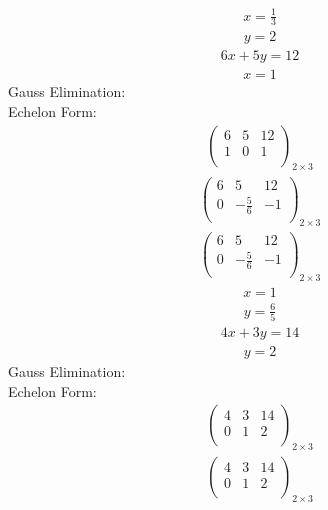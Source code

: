 \documentclass{article}
\begin{document}
\begin{align*}
x=\frac{1}{3}\end{align*}
\begin{align*}
y=2\end{align*}
\begin{align*}
6x + 5y=12\end{align*}
\begin{align*}
x=1\end{align*}
Gauss Elimination:\\
Echelon Form:\\
\begin{align*}
\left(
\begin{array}{cc|c}
6 & 5 & 12\\
1 & 0 & 1\\
\end{array}
\right)_{2\times 3}
\end{align*}
\begin{align*}
\left(
\begin{array}{cc|c}
6 & 5 & 12\\
0 & -\frac{5}{6} & -1\\
\end{array}
\right)_{2\times 3}
\end{align*}
\begin{align*}
\left(
\begin{array}{cc|c}
6 & 5 & 12\\
0 & -\frac{5}{6} & -1\\
\end{array}
\right)_{2\times 3}
\end{align*}
\begin{align*}
x=1\end{align*}
\begin{align*}
y=\frac{6}{5}\end{align*}
\begin{align*}
4x + 3y=14\end{align*}
\begin{align*}
y=2\end{align*}
Gauss Elimination:\\
Echelon Form:\\
\begin{align*}
\left(
\begin{array}{cc|c}
4 & 3 & 14\\
0 & 1 & 2\\
\end{array}
\right)_{2\times 3}
\end{align*}
\begin{align*}
\left(
\begin{array}{cc|c}
4 & 3 & 14\\
0 & 1 & 2\\
\end{array}
\right)_{2\times 3}
\end{align*}
\end{document}
